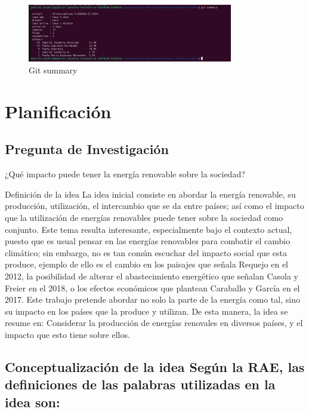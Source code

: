 \documentclass[
  letterpaper,
  DIV=11,
  numbers=noendperiod]{scrreprt}
\begin{document}
\begin{figure}[H]

{\centering \includegraphics[width=0.8\textwidth,height=\textheight]{git-summary.png}

}

\caption{Git summary}

\end{figure}%

\section{Planificación}\label{planificaciuxf3n}

\subsection{Pregunta de
Investigación}\label{pregunta-de-investigaciuxf3n}

¿Qué impacto puede tener la energía renovable sobre la sociedad?

Definición de la idea La idea inicial consiste en abordar la energía
renovable, su producción, utilización, el intercambio que se da entre
países; así como el impacto que la utilización de energías renovables
puede tener sobre la sociedad como conjunto. Este tema resulta
interesante, especialmente bajo el contexto actual, puesto que es usual
pensar en las energías renovables para combatir el cambio climático; sin
embargo, no es tan común escuchar del impacto social que esta produce,
ejemplo de ello es el cambio en los paisajes que señala Requejo en el
2012, la posibilidad de alterar el abastecimiento energético que señalan
Casola y Freier en el 2018, o los efectos económicos que plantean
Caraballo y García en el 2017. Este trabajo pretende abordar no solo la
parte de la energía como tal, sino su impacto en los países que la
produce y utilizan. De esta manera, la idea se resume en: Considerar la
producción de energías renovales en diversos países, y el impacto que
esto tiene sobre ellos.

\subsection{Conceptualización de la idea Según la RAE, las definiciones
de las palabras utilizadas en la idea
son:}\label{conceptualizaciuxf3n-de-la-idea-seguxfan-la-rae-las-definiciones-de-las-palabras-utilizadas-en-la-idea-son}
\end{document}
